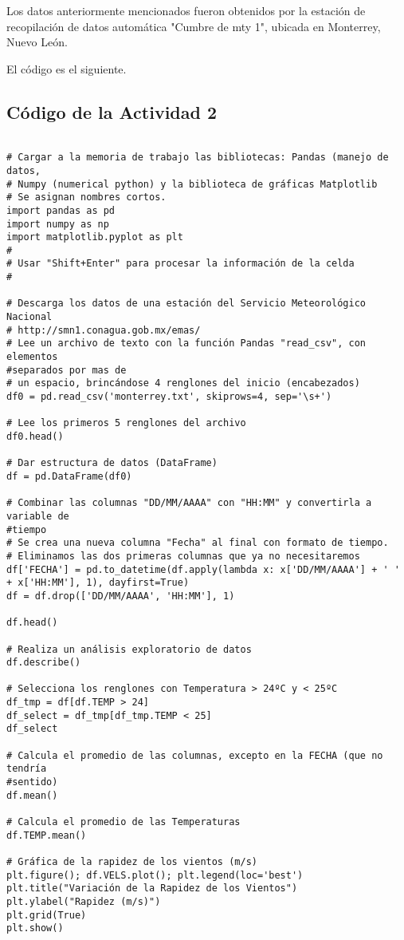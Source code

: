 \documentclass[12pt]{article}
\begin{document}
Los datos anteriormente mencionados fueron obtenidos por la estación de recopilación de datos automática "Cumbre de mty 1", ubicada en Monterrey, Nuevo León.

El código es el siguiente.

\subsection{Código de la Actividad 2}
\begin{verbatim}

# Cargar a la memoria de trabajo las bibliotecas: Pandas (manejo de datos, 
# Numpy (numerical python) y la biblioteca de gráficas Matplotlib
# Se asignan nombres cortos.
import pandas as pd
import numpy as np
import matplotlib.pyplot as plt
#
# Usar "Shift+Enter" para procesar la información de la celda
#

# Descarga los datos de una estación del Servicio Meteorológico Nacional
# http://smn1.conagua.gob.mx/emas/
# Lee un archivo de texto con la función Pandas "read_csv", con elementos
#separados por mas de 
# un espacio, brincándose 4 renglones del inicio (encabezados)
df0 = pd.read_csv('monterrey.txt', skiprows=4, sep='\s+')

# Lee los primeros 5 renglones del archivo
df0.head()

# Dar estructura de datos (DataFrame)
df = pd.DataFrame(df0)

# Combinar las columnas "DD/MM/AAAA" con "HH:MM" y convertirla a variable de 
#tiempo
# Se crea una nueva columna "Fecha" al final con formato de tiempo.
# Eliminamos las dos primeras columnas que ya no necesitaremos
df['FECHA'] = pd.to_datetime(df.apply(lambda x: x['DD/MM/AAAA'] + ' ' + x['HH:MM'], 1), dayfirst=True)
df = df.drop(['DD/MM/AAAA', 'HH:MM'], 1)

df.head()

# Realiza un análisis exploratorio de datos
df.describe()

# Selecciona los renglones con Temperatura > 24ºC y < 25ºC
df_tmp = df[df.TEMP > 24] 
df_select = df_tmp[df_tmp.TEMP < 25]
df_select

# Calcula el promedio de las columnas, excepto en la FECHA (que no tendría
#sentido)
df.mean()

# Calcula el promedio de las Temperaturas
df.TEMP.mean()

# Gráfica de la rapidez de los vientos (m/s) 
plt.figure(); df.VELS.plot(); plt.legend(loc='best')
plt.title("Variación de la Rapidez de los Vientos")
plt.ylabel("Rapidez (m/s)")
plt.grid(True)
plt.show()


\end{verbatim}
\end{document}
